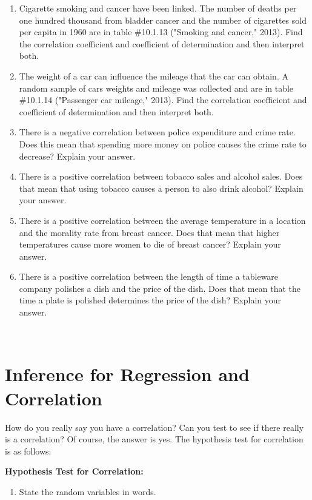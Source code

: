 \documentclass[]{book}
\providecommand{\tightlist}{%
  \setlength{\itemsep}{0pt}\setlength{\parskip}{0pt}}
\begin{document}
\begin{enumerate}
\item
  Cigarette smoking and cancer have been linked. The number of deaths per one hundred thousand from bladder cancer and the number of cigarettes sold per capita in 1960 are in table \#10.1.13 ("Smoking and cancer," 2013). Find the correlation coefficient and coefficient of determination and then interpret both.
\item
  The weight of a car can influence the mileage that the car can obtain. A random sample of cars weights and mileage was collected and are in table \#10.1.14 ("Passenger car mileage," 2013). Find the correlation coefficient and coefficient of determination and then interpret both.
\item
  There is a negative correlation between police expenditure and crime rate. Does this mean that spending more money on police causes the crime rate to decrease? Explain your answer.
\item
  There is a positive correlation between tobacco sales and alcohol sales. Does that mean that using tobacco causes a person to also drink alcohol? Explain your answer.
\item
  There is a positive correlation between the average temperature in a location and the morality rate from breast cancer. Does that mean that higher temperatures cause more women to die of breast cancer? Explain your answer.
\item
  There is a positive correlation between the length of time a tableware company polishes a dish and the price of the dish. Does that mean that the time a plate is polished determines the price of the dish? Explain your answer.
\end{enumerate}

\textbf{\\
}

\hypertarget{inference-for-regression-and-correlation}{%
\section{Inference for Regression and Correlation}\label{inference-for-regression-and-correlation}}

How do you really say you have a correlation? Can you test to see if there really is a correlation? Of course, the answer is yes. The hypothesis test for correlation is as follows:

\textbf{Hypothesis Test for Correlation:}

\begin{enumerate}
\def\labelenumi{\arabic{enumi}.}
\tightlist
\item
  State the random variables in words.
\end{enumerate}
\end{document}
